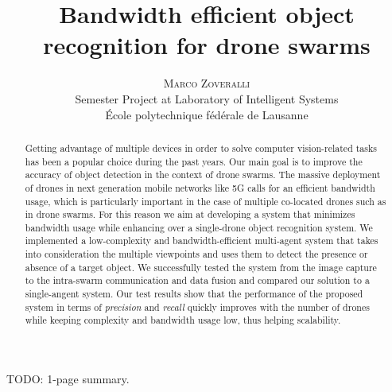 \documentclass[10pt,conference,compsocconf]{IEEEtran}
\begin{document}
	
\pretitle{\begin{center}\Huge\bfseries} %
\posttitle{\end{center}} %
\title{Bandwidth efficient object recognition for drone swarms}

\author{
	\textsc{Marco Zoveralli} \\
	\normalsize{Semester Project at Laboratory of Intelligent Systems} \\
	\normalsize \'{E}cole polytechnique f\'{e}d\'{e}rale de Lausanne
}





\maketitle
TODO: 1-page summary.
\clearpage{}


\begin{abstract}
Getting advantage of multiple devices in order to solve computer vision-related tasks has been a popular choice during the past years. Our main goal is to improve the accuracy of object detection in the context of drone swarms. 
The massive deployment of drones in next generation mobile networks like 5G calls for an efficient bandwidth usage, which is particularly important in the case of multiple co-located drones such as in drone swarms. For this reason we aim at developing a system that minimizes bandwidth usage while enhancing over a single-drone object recognition system.
 We implemented a low-complexity and bandwidth-efficient multi-agent system that takes into consideration the multiple viewpoints and uses them to detect the presence or absence of a target object. We successfully tested the system from the image capture to the intra-swarm communication and data fusion and compared our solution to a single-angent system. Our test results show that the performance of the proposed system in terms of \emph{precision} and \emph{recall} quickly improves with the number of drones while keeping complexity and bandwidth usage low, thus helping scalability.
\end{abstract}
\end{document}
